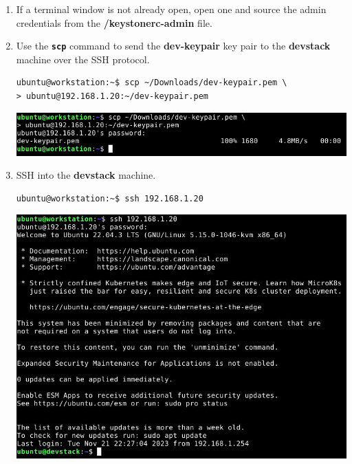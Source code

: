 \documentclass[letterpaper, 12pt]{article}
\begin{document}
\begin{enumerate}
    \item If a terminal window is not already open, open one and source the admin credentials from the 
    \textbf{\texttildemid/keystonerc-admin} file.

    \item Use the \textbf{\texttt{scp}} command to send the \textbf{dev-keypair} key pair to the \textbf{devstack}
    machine over the SSH protocol.
\begin{lstlisting}
ubuntu@workstation:~$ scp ~/Downloads/dev-keypair.pem \
> ubuntu@192.168.1.20:~/dev-keypair.pem
\end{lstlisting}

    \begin{center}
        \includegraphics[width=\linewidth]{images/part6/step2.png}
    \end{center}

    \item SSH into the \textbf{devstack} machine.
\begin{lstlisting}
ubuntu@workstation:~$ ssh 192.168.1.20
\end{lstlisting}

    \begin{center}
        \includegraphics[width=\linewidth]{images/part6/step3.png}
    \end{center}


\end{enumerate}
\end{document}
